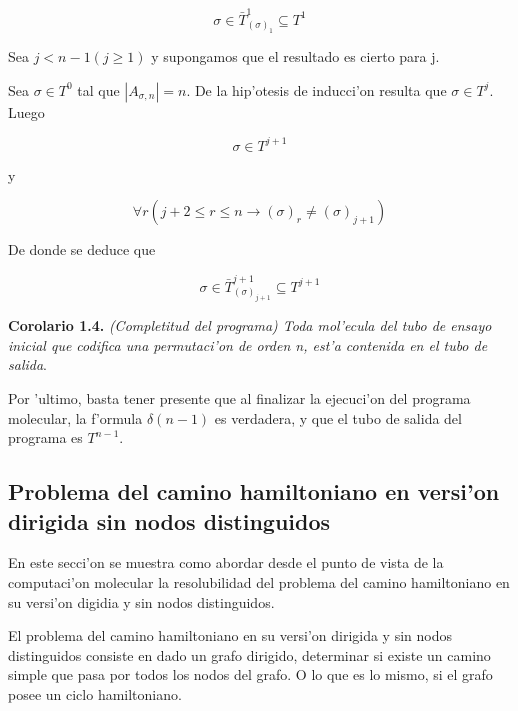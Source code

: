 \documentclass[12pt]{article}
\begin{document}
\begin{equation*}
  \sigma \in \bar{T}_{(\sigma)_{1}}^{1} \subseteq T^{1}
\end{equation*}

Sea $j < n - 1 (j \geq 1)$ y supongamos que el resultado es cierto para j.

Sea $\sigma \in T^{0}$ tal que $|A_{\sigma,n}| = n$. De la hip'otesis de inducci'on resulta que $\sigma \in T^{j}$. Luego

\begin{equation*}
  \sigma \in T^{j+1}
\end{equation*}

y

\begin{equation*}
  \forall r (j + 2 \leq r \leq n \longrightarrow (\sigma)_{r} \neq (\sigma)_{j+1})
\end{equation*}

De donde se deduce que

\begin{equation*}
  \sigma \in \bar{T}_{(\sigma)_{j+1}}^{j+1} \subseteq T^{j+1}
\end{equation*}

\textbf{Corolario 1.4.} \textit{(Completitud del programa) Toda mol'ecula del tubo de ensayo inicial que codifica una
permutaci'on de orden n, est'a contenida en el tubo de salida}.

Por 'ultimo, basta tener presente que al finalizar la ejecuci'on del programa molecular, la f'ormula $\delta(n - 1)$ es
verdadera, y que el tubo de salida del programa es $T^{n-1}$.

\subsection{Problema del camino hamiltoniano en versi'on dirigida sin nodos distinguidos}

En este secci'on se muestra como abordar desde el punto de vista de la computaci'on molecular la resolubilidad
del problema del camino hamiltoniano en su versi'on digidia y sin nodos distinguidos.

El problema del camino hamiltoniano en su versi'on dirigida y sin nodos distinguidos consiste en
dado un grafo dirigido, determinar si existe un camino simple que pasa por todos los nodos del grafo. O lo
que es lo mismo, si el grafo posee un ciclo hamiltoniano.
\end{document}
